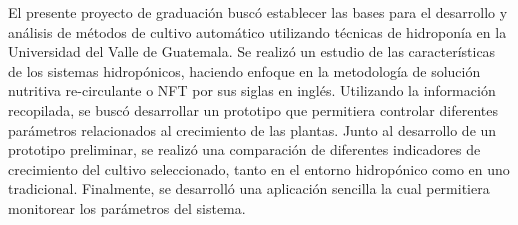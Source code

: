

El presente proyecto de graduación buscó establecer las bases para el desarrollo y análisis de métodos de cultivo automático utilizando técnicas de hidroponía en la Universidad del Valle de Guatemala. Se realizó un estudio de las características de los sistemas hidropónicos, haciendo enfoque en la metodología de solución nutritiva re-circulante o NFT por sus siglas en inglés. Utilizando la información recopilada, se buscó desarrollar un prototipo que permitiera controlar diferentes parámetros relacionados al crecimiento de las plantas. Junto al desarrollo de un prototipo preliminar, se realizó una comparación de diferentes indicadores de crecimiento del cultivo seleccionado, tanto en el entorno hidropónico como en uno tradicional. Finalmente, se desarrolló una aplicación sencilla la cual permitiera monitorear los parámetros del sistema.